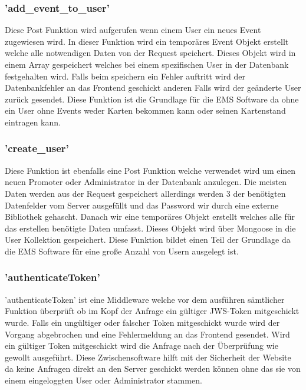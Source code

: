 		 	\subsubsection{'add\_event\_to\_user'}
		 		Diese Post Funktion wird aufgerufen wenn einem User ein neues Event zugewiesen wird. In dieser Funktion wird ein temporäres Event Objekt erstellt welche alle notwendigen Daten von der Request speichert. Dieses Objekt wird in einem Array gespeichert welches bei einem spezifischen User in der Datenbank festgehalten wird. Falls beim speichern ein Fehler auftritt wird der Datenbankfehler an das Frontend geschickt anderen Falls wird der geänderte User zurück gesendet. Diese Funktion ist die Grundlage für die EMS Software da ohne ein User ohne Events weder Karten bekommen kann oder seinen Kartenstand eintragen kann.
		 		
		 	
		 	\subsubsection{'create\_user'}
		 		Diese Funktion ist ebenfalls eine Post Funktion welche verwendet wird um einen neuen Promoter oder Administrator in der Datenbank anzulegen. Die meisten Daten werden aus der Request gespeichert allerdings werden 3 der benötigten Datenfelder vom Server ausgefüllt und das Password wir durch eine externe Bibliothek gehascht. Danach wir eine temporäres Objekt erstellt welches alle für das erstellen benötigte Daten umfasst. Dieses Objekt wird über Mongoose in die User Kollektion gespeichert. Diese Funktion bildet einen Teil der Grundlage da die EMS Software für eine große Anzahl von Usern ausgelegt ist. 
		 		
		 		
		 	\subsubsection{'authenticateToken'}
		 		'authenticateToken' ist eine Middleware welche vor dem ausführen sämtlicher Funktion überprüft ob im Kopf der Anfrage ein gültiger JWS-Token mitgeschickt wurde. Falls ein ungültiger oder falscher Token mitgeschickt wurde wird der Vorgang abgebrochen und eine Fehlermeldung an das Frontend gesendet. Wird ein gültiger Token mitgeschickt wird die Anfrage nach der Überprüfung wie gewollt ausgeführt. Diese Zwischensoftware hilft mit der Sicherheit der Website da keine Anfragen direkt an den Server geschickt werden können ohne das sie von einem eingeloggten User oder Administrator stammen. 
		 		

